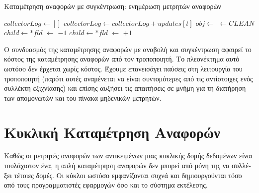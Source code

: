 \begin{greek}
\begin{algorithm}[H]
  \caption{Καταμέτρηση αναφορών με συγκέντρωση: ενημέρωση μετρητών αναφορών}
  \label{alg:refcnt_4}
  \begin{algorithmic}[1]
      \State {}
      \State {}
      \State {}
    \EndProcedure
    \Statex
      \State $collectorLog \gets []$
        \State $collectorLog \gets collectorLog + updates[t]$
      \EndFor
    \EndProcedure
    \Statex
        \State $obj \gets$ 
         
          \State {} $\gets CLEAN$
          \State {}
          \State {}
        \EndIf
      \EndFor
    \EndProcedure
    \Statex
       
        \State $child \gets *fld$
          \State {} $\gets$  $-1$
            \State {}
          \EndIf
        \EndIf
      \EndFor
    \EndProcedure
    \Statex
       
        \State $child \gets *fld$
          \State {} $\gets$  $+1$
        \EndIf
      \EndFor
    \EndProcedure
  \end{algorithmic}
\end{algorithm}  

Ο συνδυασμός της καταμέτρησης αναφορών με αναβολή και συγκέντρωση
αφαιρεί το κόστος της καταμέτρησης αναφορών από τον τροποποιητή.
Το πλεονέκτημα αυτό ωστόσο δεν έρχεται χωρίς κόστος. Έχουμε
επανεισάγει παύσεις στη λειτουργία του τροποποιητή (παρότι
αυτές αναμένεται να είναι συντομότερες από τις αντίστοιχες ενός
συλλέκτη εξιχνίασης) και επίσης αυξήσει τις απαιτήσεις σε μνήμη
για τη διατήρηση των απομονωτών και του πίνακα μηδενικών μετρητών.

\section{Κυκλική Καταμέτρηση Αναφορών}
Καθώς οι μετρητές αναφορών των αντικειμένων μιας κυκλικής δομής
δεδομένων είναι τουλάχιστον ένα, η απλή καταμέτρηση αναφορών
δεν μπορεί από μόνη της να συλλέξει τέτοιες δομές. Οι κύκλοι
ωστόσο εμφανίζονται συχνά και δημιουργούνται τόσο από τους
προγραμματιστές εφαρμογών όσο και το σύστημα εκτέλεσης.


\end{greek}
